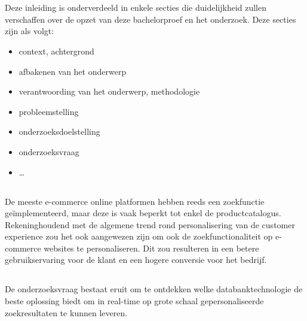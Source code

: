 
\chapter{}
\label{ch:inleiding}

Deze inleiding is onderverdeeld in enkele secties die duidelijkheid zullen verschaffen over de opzet van deze bachelorproef en het onderzoek. Deze secties zijn als volgt:

\begin{itemize}
  \item context, achtergrond
  \item afbakenen van het onderwerp
  \item verantwoording van het onderwerp, methodologie
  \item probleemstelling
  \item onderzoeksdoelstelling
  \item onderzoeksvraag
  \item \ldots
\end{itemize}

\section{}
\label{sec:probleemstelling}

De meeste e-commerce online platformen hebben reeds een zoekfunctie geïmplementeerd,  maar deze is vaak beperkt tot enkel de productcatalogus. Rekeninghoudend met de algemene trend rond personalisering van de customer experience zou het ook aangewezen zijn om ook de zoekfunctionaliteit op e-commerce websites te personaliseren. Dit zou resulteren in een betere  gebruikservaring voor de klant en een hogere conversie voor het bedrijf.

\section{}
\label{sec:onderzoeksvraag}

De onderzoeksvraag bestaat eruit om te ontdekken welke databanktechnologie de beste oplossing biedt om in real-time op grote schaal gepersonaliseerde zoekresultaten te kunnen leveren.

